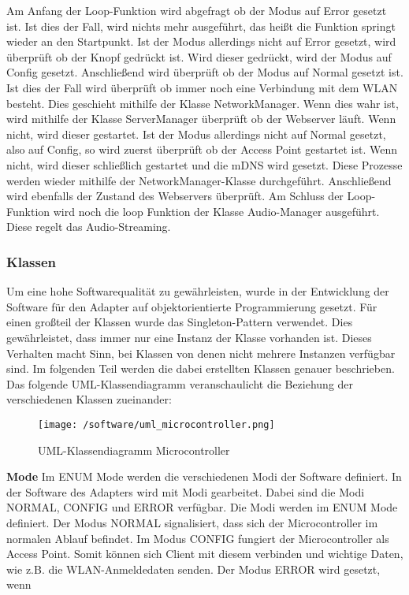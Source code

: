 \documentclass[]{article}
\begin{document}
Am Anfang der Loop-Funktion wird abgefragt ob der Modus auf Error gesetzt ist. Ist dies der Fall, wird nichts mehr ausgeführt, das heißt die Funktion springt wieder an den Startpunkt. Ist der Modus allerdings nicht auf Error gesetzt, wird überprüft ob der Knopf gedrückt ist. Wird dieser gedrückt, wird der Modus auf Config gesetzt. Anschließend wird überprüft ob der Modus auf Normal gesetzt ist. Ist dies der Fall wird überprüft ob immer noch eine Verbindung mit dem WLAN besteht. Dies geschieht mithilfe der Klasse NetworkManager. Wenn dies wahr ist, wird mithilfe der Klasse ServerManager überprüft ob der Webserver läuft. Wenn nicht, wird dieser gestartet. Ist der Modus allerdings nicht auf Normal gesetzt, also auf Config, so wird zuerst überprüft ob der Access Point gestartet ist. Wenn nicht, wird dieser schließlich gestartet und die mDNS wird gesetzt. Diese Prozesse werden wieder mithilfe der NetworkManager-Klasse durchgeführt. Anschließend wird ebenfalls der Zustand des Webservers überprüft. Am Schluss der Loop-Funktion wird noch die loop Funktion der Klasse Audio-Manager ausgeführt. Diese regelt das Audio-Streaming.
\subsubsection{Klassen}
Um eine hohe Softwarequalität zu gewährleisten, wurde in der Entwicklung der Software für den Adapter auf objektorientierte Programmierung gesetzt. Für einen großteil der Klassen wurde das Singleton-Pattern verwendet. Dies gewährleistet, dass immer nur eine Instanz der Klasse vorhanden ist. Dieses Verhalten macht Sinn, bei Klassen von denen nicht mehrere Instanzen verfügbar sind. Im folgenden Teil werden die dabei erstellten Klassen genauer beschrieben. Das folgende UML-Klassendiagramm veranschaulicht die Beziehung der verschiedenen Klassen zueinander:
\begin{figure}[H]
\texttt{[image: /software/uml\_microcontroller.png]}
\caption{UML-Klassendiagramm Microcontroller}
\end{figure}
\textbf{Mode}
Im ENUM Mode werden die verschiedenen Modi der Software definiert.
In der Software des Adapters wird mit Modi gearbeitet. Dabei sind die Modi NORMAL, CONFIG und ERROR verfügbar. Die Modi werden im ENUM Mode definiert. Der Modus NORMAL signalisiert, dass sich der Microcontroller im normalen Ablauf befindet. Im Modus CONFIG fungiert der Microcontroller als Access Point. Somit können sich Client mit diesem verbinden und wichtige Daten, wie z.B. die WLAN-Anmeldedaten senden. Der Modus ERROR wird gesetzt, wenn 
\end{document}
